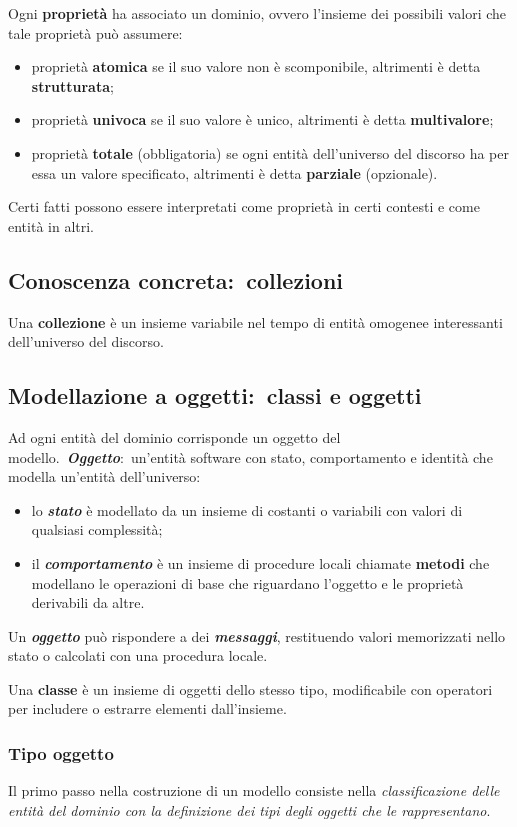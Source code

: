 Ogni \textbf{proprietà} ha associato un dominio, ovvero l'insieme dei possibili valori che tale proprietà può assumere:
\begin{itemize}
	\item proprietà \textbf{atomica} se il suo valore non è scomponibile, altrimenti è detta \textbf{strutturata};
	\item proprietà \textbf{univoca} se il suo valore è unico, altrimenti è detta \textbf{multivalore};
	\item proprietà \textbf{totale} (obbligatoria) se ogni entità dell'universo del discorso ha per essa un valore specificato, altrimenti è detta \textbf{parziale} (opzionale).
\end{itemize}
Certi fatti possono essere interpretati come proprietà in certi contesti e come entità in altri.

\subsection{Conoscenza concreta:\ collezioni}
Una \textbf{collezione} è un insieme variabile nel tempo di entità omogenee interessanti dell'universo del discorso.

\subsection{Modellazione a oggetti:\ classi e oggetti}
Ad ogni entità del dominio corrisponde un oggetto del modello.\
\textbf{\textit{Oggetto}}:\ un'entità software con stato, comportamento e identità che modella un'entità dell'universo:
\begin{itemize}
	\item lo \textbf{\textit{stato}} è modellato da un insieme di costanti o variabili con valori di qualsiasi complessità;
	\item il \textbf{\textit{comportamento}} è un insieme di procedure locali chiamate \textbf{metodi} che modellano le operazioni di base che riguardano l'oggetto e le proprietà derivabili da altre.
\end{itemize}
Un \textbf{\textit{oggetto}} può rispondere a dei \textbf{\textit{messaggi}}, restituendo valori memorizzati nello stato o calcolati con una procedura locale.

Una \textbf{classe} è un insieme di oggetti dello stesso tipo, modificabile con operatori per includere o estrarre elementi dall'insieme.

\subsubsection{Tipo oggetto}
Il primo passo nella costruzione di un modello consiste nella \textit{classificazione delle entità del dominio con la definizione dei tipi degli oggetti che le rappre\-sentano}.\

